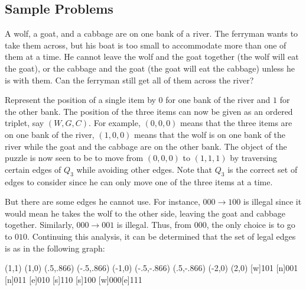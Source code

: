 \newpage

\subsection{Sample Problems}
\begin{exa}\label{exa:wolf_goat_cabbage}
A wolf, a goat, and a cabbage are on one bank of a river. The
ferryman wants to take them across, but his boat is too small to
accommodate more than one of them at a time. 
He cannot leave the wolf and the goat together (the wolf will eat the goat), 
or the cabbage and the goat (the goat will eat the cabbage) unless he is with them. 
Can the ferryman still get all of them across the river?
\begin{sol}
Represent the position of a single item by $0$ for one bank of the 
river and  $1$ for the other bank. The position
of the three items can now be given as an ordered triplet, say
$(W,G,C)$. For example, $(0,0,0)$ means that the three items are
on one bank of the river, $(1,0,0)$ means that the wolf is on one
bank of the river while the goat and the cabbage are on the other
bank. The object of the puzzle is now seen to be to move from
$(0,0,0)$ to $(1,1,1)$ by traversing certain edges of $Q_3$ while avoiding
other edges. Note that $Q_3$ is the correct set of edges to consider 
since he can only move one of the three items at a time.

But there are some edges he cannot use.
For instance, $000\rightarrow 100$ is illegal since
it would mean he takes the wolf to the other side, leaving the goat and cabbage together.
Similarly, $000\rightarrow 001$ is illegal. Thus, from $000$, the only choice is to go to $010$.
Continuing this analysis, it can be determined that the set of legal edges is as in the following graph:

\begin{center}
\begin{graph}(1,1)
(1,0) (.5,.866) (-.5,.866)
(-1,0) (-.5,-.866)
(.5,-.866) (-2,0) (2,0)
[w]{101} [n]{001}
[n]{011} [e]{010}
[s]{110} [s]{100}
[w]{000}[e]{111} 
    
\end{graph}\vspace*{.5in}
\end{center}


\end{sol}
\end{exa}
